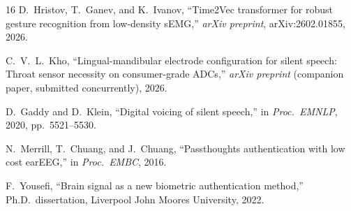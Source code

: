 \documentclass[11pt, a4paper]{article}
\begin{document}
\begin{thebibliography}{16}
D.\ Hristov, T.\ Ganev, and K.\ Ivanov, ``Time2Vec transformer for robust gesture recognition from low-density sEMG,'' \emph{arXiv preprint}, arXiv:2602.01855, 2026.

C.~V.~L.\ Kho, ``Lingual-mandibular electrode configuration for silent speech: Throat sensor necessity on consumer-grade ADCs,'' \emph{arXiv preprint} (companion paper, submitted concurrently), 2026.

D.\ Gaddy and D.\ Klein, ``Digital voicing of silent speech,'' in \emph{Proc.\ EMNLP}, 2020, pp.\ 5521--5530.

N.\ Merrill, T.\ Chuang, and J.\ Chuang, ``Passthoughts authentication with low cost earEEG,'' in \emph{Proc.\ EMBC}, 2016.

F.\ Yousefi, ``Brain signal as a new biometric authentication method,'' Ph.D.\ dissertation, Liverpool John Moores University, 2022.

\end{thebibliography}
\end{document}
